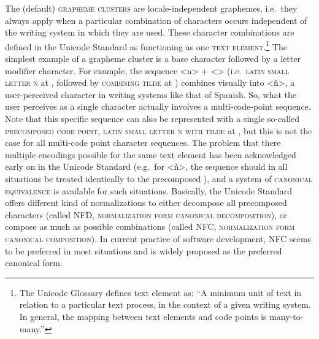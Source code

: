 The (default) \textsc{grapheme clusters} are locale-independent graphemes,
i.e.~they always apply when a particular combination of characters occurs
independent of the writing system in which they are used. These character
combinations are defined in the Unicode Standard as functioning as one
\textsc{text element}.\footnote{The Unicode Glossary defines text element as:
``A minimum unit of text in relation to a particular text process, in the
context of a given writing system. In general, the mapping between text elements
and code points is many-to-many.''} The simplest example of a grapheme cluster
is a base character followed by a letter modifier character. For example, the
sequence <n> + <> (i.e.~\textsc{latin small letter n} at , followed
by \textsc{combining tilde} at ) combines visually into <ñ>, a
user-perceived character in writing systems like that of Spanish. So, what the
user perceives as a single character actually involves a multi-code-point
sequence. Note that this specific sequence can also be represented with a single
so-called \textsc{precomposed code point}, \textsc{latin small letter n with
tilde} at , but this is not the case for all multi-code point
character sequences. The problem that there multiple encodings possible for the
same text element has been acknowledged early on in the Unicode Standard
(e.g.~for <ñ>, the sequence   should in all situations be
treated identically to the precomposed ), and a system of
\textsc{canonical equivalence} is available for such situations. Basically, the
Unicode Standard offers different kind of normalizations to either decompose all
precomposed characters (called \textsc{NFD}, \textsc{normalization form
canonical decomposition}), or compose as much as possible combinations (called
\textsc{NFC}, \textsc{normalization form canonical composition}). In current
practice of software development, NFC seems to be preferred in most situations
and is widely proposed as the preferred canonical form.

